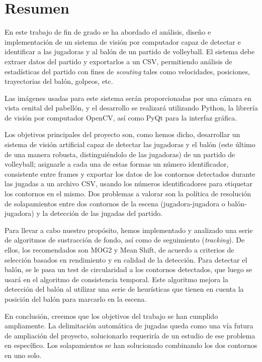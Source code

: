 \section*{Resumen}
En este trabajo de fin de grado se ha abordado el análisis, diseño e implementación de un sistema de visión por computador capaz de detectar e identificar a las jugadoras y al balón de un partido de volleyball. El sistema debe extraer datos del partido y exportarlos a un CSV, permitiendo análisis de estadísticas del partido con fines de \textit{scouting} tales como velocidades, posiciones, trayectorias del balón, golpeos, etc. 

Las imágenes usadas para este sistema serán proporcionadas por una cámara en vista cenital del pabellón, y el desarrollo se realizará utilizando Python, la librería de visión por computador OpenCV, así como PyQt para la interfaz gráfica.

Los objetivos principales del proyecto son, como hemos dicho, desarrollar un sistema de visión artificial capaz de detectar las jugadoras y el balón (este último de una manera robusta, distinguiéndolo de las jugadoras) de un partido de volleyball; asignarle a cada una de estas formas un número identificador, consistente entre frames y exportar los datos de los contornos detectados durante las jugadas a un archivo CSV, usando los números identificadores para etiquetar los contornos en el mismo. Dos problemas a valorar son la política de resolución de solapamientos entre dos contornos de la escena (jugadora-jugadora o balón-jugadora) y la detección de las jugadas del partido.

Para llevar a cabo nuestro propósito, hemos implementado y analizado una serie de algoritmos de sustracción de fondo, así como de seguimiento (\textit{tracking}). De ellos, los recomendados son MOG2 y Mean Shift, de acuerdo a criterios de selección basados en rendimiento y en calidad de la detección. Para detectar el balón, se le pasa un test de circularidad a los contornos detectados, que luego se usará en el algoritmo de consistencia temporal. Este algoritmo mejora la detección del balón al utilizar una serie de heurísticas que tienen en cuenta la posición del balón para marcarlo en la escena.

En conclusión, creemos que los objetivos del trabajo se han cumplido ampliamente. La delimitación automática de jugadas queda como una vía futura de ampliación del proyecto, solucionarlo requeriría de un estudio de ese problema en específico. Los solapamientos se han solucionado combinando los dos contornos en uno solo. 


